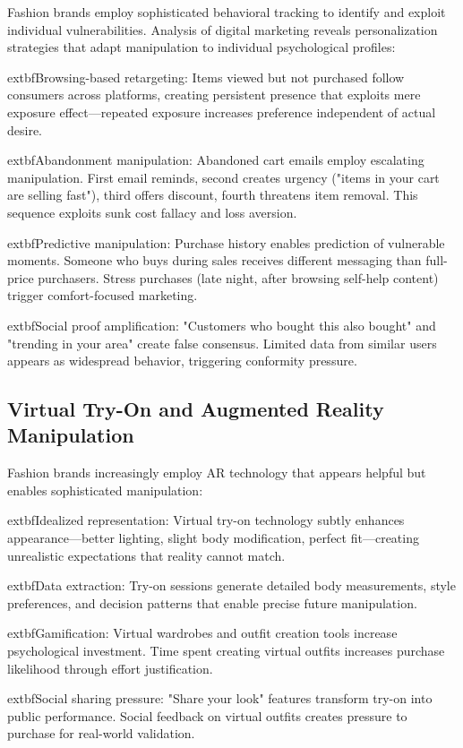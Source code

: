 Fashion brands employ sophisticated behavioral tracking to identify and exploit individual vulnerabilities. Analysis of digital marketing reveals personalization strategies that adapt manipulation to individual psychological profiles:

	extbf{Browsing-based retargeting}: Items viewed but not purchased follow consumers across platforms, creating persistent presence that exploits mere exposure effect—repeated exposure increases preference independent of actual desire.

	extbf{Abandonment manipulation}: Abandoned cart emails employ escalating manipulation. First email reminds, second creates urgency ("items in your cart are selling fast"), third offers discount, fourth threatens item removal. This sequence exploits sunk cost fallacy and loss aversion.

	extbf{Predictive manipulation}: Purchase history enables prediction of vulnerable moments. Someone who buys during sales receives different messaging than full-price purchasers. Stress purchases (late night, after browsing self-help content) trigger comfort-focused marketing.

	extbf{Social proof amplification}: "Customers who bought this also bought" and "trending in your area" create false consensus. Limited data from similar users appears as widespread behavior, triggering conformity pressure.

\subsection{Virtual Try-On and Augmented Reality Manipulation}

Fashion brands increasingly employ AR technology that appears helpful but enables sophisticated manipulation:

	extbf{Idealized representation}: Virtual try-on technology subtly enhances appearance—better lighting, slight body modification, perfect fit—creating unrealistic expectations that reality cannot match.

	extbf{Data extraction}: Try-on sessions generate detailed body measurements, style preferences, and decision patterns that enable precise future manipulation.

	extbf{Gamification}: Virtual wardrobes and outfit creation tools increase psychological investment. Time spent creating virtual outfits increases purchase likelihood through effort justification.

	extbf{Social sharing pressure}: "Share your look" features transform try-on into public performance. Social feedback on virtual outfits creates pressure to purchase for real-world validation.

